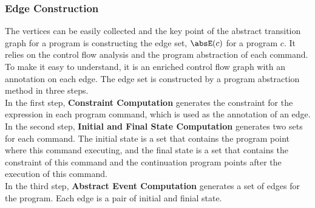 \subsubsection{Edge Construction}
\label{sec:abs_prog-edge}
  The vertices can be easily collected and the key point of the abstract
  transition graph for a program is constructing the edge set, $\absE(c)$ for a program $c$.
  It relies on the control flow analysis and the program abstraction of each command.
  To make it easy to understand, it
  is an enriched control flow graph with an annotation on each edge.
  The edge set is constructed by a program abstraction method in three steps.
  \\
  In the first step, \textbf{Constraint Computation} generates the constraint
  for the expression in each program command,
  which is used as the annotation of an edge.
  \\
  In the second step, \textbf{Initial and Final State Computation} generates two sets for each command. 
  The initial state is a set that contains the
  program point where this command  executing, 
  and the final state is a set
  that contains the constraint of this command
  and the continuation program points after the execution of this command.
  \\ 
  In the third step, \textbf{Abstract Event Computation} generates a set of edges for the program.
  Each edge is a pair of initial and finial state.
%
